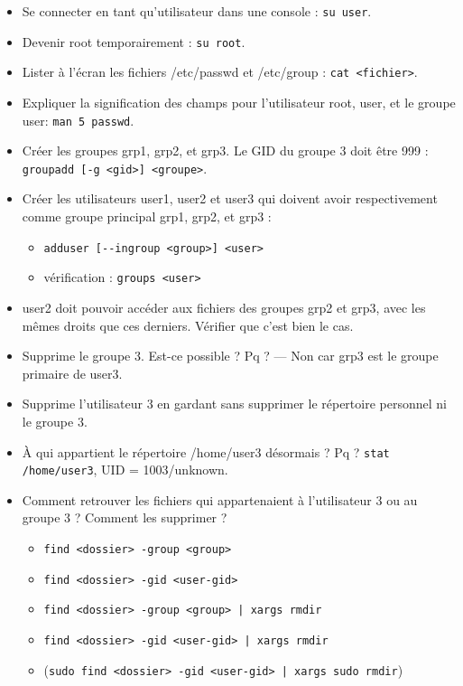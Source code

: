 \documentclass[a4paper]{article}
\begin{document}
\begin{itemize}

\item Se connecter en tant qu'utilisateur dans une console : \texttt{su user}.

\item Devenir root temporairement : \texttt{su root}.

\item Lister à l'écran les fichiers /etc/passwd et /etc/group : \texttt{cat <fichier>}.

\item Expliquer la signification des champs pour l’utilisateur root, user, et le groupe user: \texttt{man 5 passwd}.

\item Créer les groupes grp1, grp2, et grp3. Le GID du groupe 3 doit être 999 : \texttt{groupadd [-g <gid>] <groupe>}.

\item Créer les utilisateurs user1, user2 et user3 qui doivent avoir respectivement comme groupe principal grp1, grp2, et grp3 :
\begin{example}
    \begin{itemize}
        \item \texttt{adduser [-{}-ingroup <group>] <user>}
        \item vérification : \texttt{groups <user>}
    \end{itemize}
\end{example}

\item user2 doit pouvoir accéder aux fichiers des groupes grp2 et grp3, avec les mêmes droits que ces derniers. Vérifier que c'est bien le cas.

\item Supprime le groupe 3. Est-ce possible ? Pq ? --- Non car grp3 est le groupe primaire de user3.

\item Supprime l'utilisateur 3 en gardant sans supprimer le répertoire personnel ni le groupe 3.

\item À qui appartient le répertoire /home/user3 désormais ? Pq ? \texttt{stat /home/user3}, UID = 1003/unknown.

\item Comment retrouver les fichiers qui appartenaient à l'utilisateur 3 ou au groupe 3 ? Comment les supprimer ?
\begin{example}
    \begin{itemize}
        \item \texttt{find <dossier> -group <group>}
        \item \texttt{find <dossier> -gid <user-gid>}
        \item \texttt{find <dossier> -group <group> | xargs rmdir}
        \item \texttt{find <dossier> -gid <user-gid> | xargs rmdir}
        \item (\texttt{sudo find <dossier> -gid <user-gid> | xargs sudo rmdir})
    \end{itemize}
\end{example}


\end{itemize}
\end{document}
